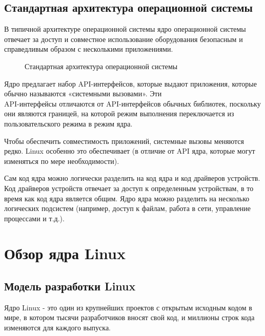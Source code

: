 \documentclass{article}
\begin{document}
    \subsection{Стандартная архитектура операционной системы}
    В типичной архитектуре операционной системы ядро операционной системы 
    отвечает за доступ и совместное использование оборудования безопасным и 
    справедливым образом с несколькими приложениями.
     
    \newpage
    \begin{figure}[h]
        \caption{Стандартная архитектура операционной системы}
    \end{figure} 

    Ядро предлагает набор API-интерфейсов, которые выдают приложения, которые 
    обычно называются «системными вызовами». Эти\\API-интерфейсы отличаются от 
    API-интерфейсов обычных библиотек, поскольку они являются границей, на 
    которой режим выполнения переключается из пользовательского режима в режим 
    ядра. 
    
    Чтобы обеспечить совместимость приложений, системные вызовы меняются 
    редко. Linux особенно это обеспечивает (в отличие от API ядра, которые могут
    изменяться по мере необходимости).

    Сам код ядра можно логически разделить на код ядра и код драйверов 
    устройств. Код драйверов устройств отвечает за доступ к определенным 
    устройствам, в то время как код ядра является общим. Ядро ядра можно 
    разделить на несколько логических подсистем (например, доступ к файлам, 
    работа в сети, управление процессами и т.д.).

    \section{Обзор ядра Linux}
    \subsection{Модель разработки Linux}
    Ядро Linux - это один из крупнейших проектов с открытым исходным кодом в 
    мире, в котором тысячи разработчиков вносят свой код, и миллионы строк кода 
    изменяются для каждого выпуска.
\end{document}
